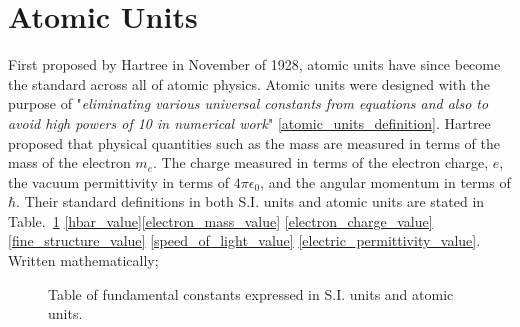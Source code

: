     \section{Atomic Units} \label{sec:atomic_units}    
        First proposed by Hartree in November of 1928, atomic units have since become the standard across all of atomic physics. Atomic units were designed with the purpose of "\textit{eliminating various universal constants from equations and also to avoid high powers of 10 in numerical work}" \ref{atomic_units_definition}. Hartree proposed that physical quantities such as the mass are measured in terms of the mass of the electron $m_e$. The charge measured in terms of the electron charge, $e$, the vacuum permittivity in terms of $4\pi \epsilon_0$, and the angular momentum in terms of $\hbar$. Their standard definitions in both S.I. units and atomic units are stated in Table.~\ref{tab:units} \ref{hbar_value}\ref{electron_mass_value} \ref{electron_charge_value} \ref{fine_structure_value} \ref{speed_of_light_value} \ref{electric_permittivity_value}. Written mathematically;

        \begin{figure}[b]
            \centering 
            \label{tab:units}
            \caption{Table of fundamental constants expressed in S.I. units and atomic units.}
        \end{figure}
        
